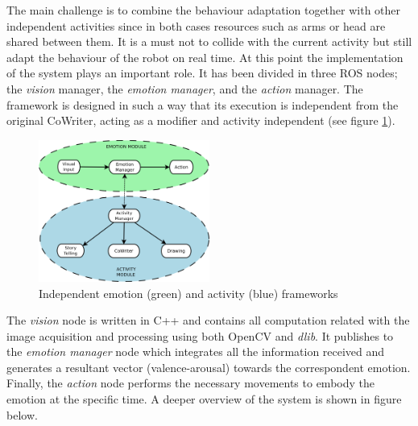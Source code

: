 The main challenge is to combine the behaviour adaptation together with other independent activities since in both cases resources such as arms or head are shared between them. It is a must not to collide with the current activity but still adapt the behaviour of the robot on real time. At this point the implementation of the system plays an important role. It has been divided in three ROS nodes; the \textit{vision} manager, the \textit{emotion manager}, and the \textit{action} manager. The framework is designed in such a way that its execution is independent from the original CoWriter, acting as a modifier and activity independent (see figure \ref{fig:system}).

\bigskip

\begin{figure}[h!]
        \centering
        \includegraphics[width=0.5\textwidth]{figures/system.png}
        \caption{Independent emotion (green) and activity (blue) frameworks}
        \label{fig:system}
\end{figure}

\bigskip

The \textit{vision} node is written in C++ and contains all computation related with the image acquisition and processing using both OpenCV and \textit{dlib}. It publishes to the \textit{emotion manager} node which integrates all the information received and generates a resultant vector (valence-arousal) towards the correspondent emotion. Finally, the \textit{action} node performs the necessary movements to embody the emotion at the specific time. A deeper overview of the system is shown in figure below.

